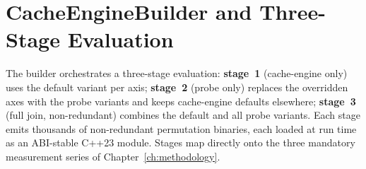 \section{CacheEngineBuilder and Three-Stage Evaluation}\label{sec:builder}

The builder orchestrates a three-stage evaluation: \textbf{stage~1} (cache-engine only)
uses the default variant per axis; \textbf{stage~2} (probe only) replaces the overridden
axes with the probe variants and keeps cache-engine defaults elsewhere; \textbf{stage~3}
(full join, non-redundant) combines the default and all probe variants. Each stage emits
thousands of non-redundant permutation binaries, each loaded at run time as an ABI-stable
C++23 module. Stages map directly onto the three mandatory measurement series of
Chapter~\ref{ch:methodology}.
